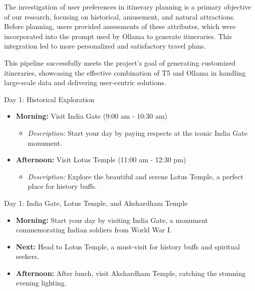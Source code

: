 \documentclass[conference]{IEEEtran}
\begin{document}
        The investigation of user preferences in itinerary planning is a primary objective of our research, focusing on historical, amusement, and natural attractions. Before planning, users provided assessments of these attributes, which were incorporated into the prompt used by Ollama to generate itineraries. This integration led to more personalized and satisfactory travel plans.

This pipeline successfully meets the project's goal of generating customized itineraries, showcasing the effective combination of T5 and Ollama in handling large-scale data and delivering user-centric solutions.

\begin{tcolorbox}[colframe=black!75!white, colback=white!90!black, title=Sample One-Day Itinerary with User Preferences]
Day 1: Historical Exploration
\begin{itemize}
    \item \textbf{Morning:} Visit India Gate (9:00 am - 10:30 am)
    \begin{itemize}
        \item \textit{Description:} Start your day by paying respects at the iconic India Gate monument.
    \end{itemize}
    \item \textbf{Afternoon:} Visit Lotus Temple (11:00 am - 12:30 pm)
    \begin{itemize}
        \item \textit{Description:} Explore the beautiful and serene Lotus Temple, a perfect place for history buffs.
    \end{itemize}
\end{itemize}
\end{tcolorbox}

\begin{tcolorbox}[colframe=black!75!white, colback=white!90!black, title=Sample One-Day Itinerary without User Preferences]
Day 1: India Gate, Lotus Temple, and Akshardham Temple
\begin{itemize}
    \item \textbf{Morning:} Start your day by visiting India Gate, a monument commemorating Indian soldiers from World War I.
    \item \textbf{Next:} Head to Lotus Temple, a must-visit for history buffs and spiritual seekers.
    \item \textbf{Afternoon:} After lunch, visit Akshardham Temple, catching the stunning evening lighting.
\end{itemize}
\end{tcolorbox}
\end{document}
